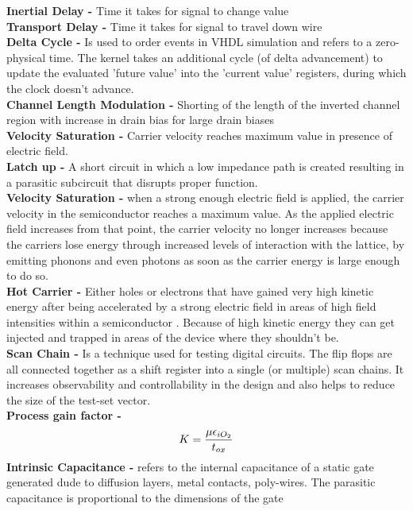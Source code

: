 \documentclass[9pt,fleqn]{article}
\begin{document}
\begin{multicols}{3}
    \textbf{Inertial Delay -} Time it takes for signal to change value \\
    \textbf{Transport Delay -} Time it takes for signal to travel down wire \\
    \textbf{Delta Cycle -} Is used to order events in VHDL simulation and
    refers to a zero-physical time. The kernel takes an additional cycle (of
    delta advancement) to update the evaluated 'future value' into the 'current
    value' registers, during which the clock doesn't advance. \\
    \textbf{Channel Length Modulation -} Shorting of the length of the inverted
    channel region with increase in drain bias for large drain biases \\
    \textbf{Velocity Saturation -} Carrier velocity reaches maximum value in
    presence of electric field. \\
    \textbf{Latch up -} A short circuit in which a low impedance path is
    created resulting in a parasitic subcircuit that disrupts proper function.\\
    \textbf{Velocity Saturation -} when a strong enough electric field is
    applied, the carrier velocity in the semiconductor reaches a maximum value.
    As the applied electric field increases from that point, the carrier
    velocity no longer increases because the carriers lose energy through
    increased levels of interaction with the lattice, by emitting phonons and
    even photons as soon as the carrier energy is large enough to do so.\\
    \textbf{Hot Carrier -} Either holes or electrons  that have gained very
    high kinetic energy after being accelerated by a strong electric field in
    areas of high field intensities within a semiconductor .  Because of high
    kinetic energy they can get injected and trapped in areas of the device
    where they shouldn't be.\\
    \textbf{Scan Chain -} Is a technique used for testing digital circuits. The
    flip flops are all connected together as a shift register into a single (or
    multiple) scan chains. It increases observability and controllability in
    the design and also helps to reduce the size of the test-set vector. \\
    \textbf{Process gain factor -} $$ K = {\mu \epsilon_{iO_{2}} \over t_{ox}} $$
    \textbf{Intrinsic Capacitance -} refers to the internal capacitance of a
    static gate generated dude to diffusion layers, metal contacts, poly-wires.
    The parasitic capacitance is proportional to the dimensions of the gate

\end{multicols}
\end{document}
